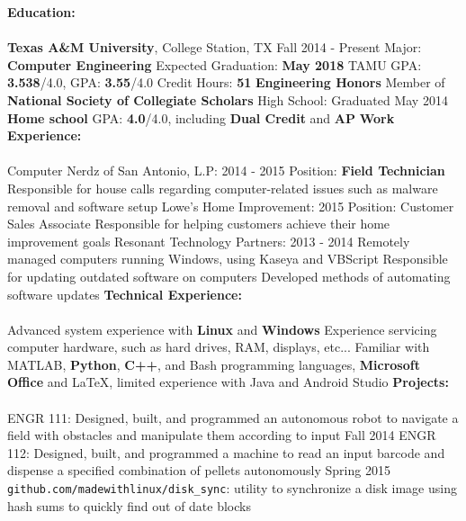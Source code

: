 \documentclass[12pt]{article}
\newcommand{\upspace}{\vspace{0px}}
\newcommand{\zzz}[1]{\upspace \0 \textbf{#1} \\ \vspace{-0.7\baselineskip} \hrulefill \vspace{-2px} \\ }
\newcommand{\aaa}{\upspace \1}
\newcommand{\bbb}{\upspace \2}
\begin{document}
\begin{flushleft}
\begin{outline}[compactitem]
\zzz{Education:}
	\aaa \textbf{Texas A\&M University}, College Station, TX \hfill Fall 2014 - Present
		\bbb Major: \textbf{Computer Engineering}
		\bbb Expected Graduation: \textbf{May 2018}
		\bbb TAMU GPA: \textbf{3.538}/4.0, GPA: \textbf{3.55}/4.0
		\bbb Credit Hours: \textbf{51}
		\bbb \textbf{Engineering Honors}
		\bbb Member of \textbf{National Society of Collegiate Scholars}
	\aaa High School: \hfill Graduated May 2014
		\bbb \textbf{Home school}
		\bbb GPA: \textbf{4.0}/4.0, including \textbf{Dual Credit} and \textbf{AP}
\zzz{Work Experience:}
	\aaa Computer Nerdz of San Antonio, L.P: \hfill 2014 - 2015
		\bbb Position: \textbf{Field Technician}
		\bbb Responsible for house calls regarding computer-related issues such as malware removal and software setup
	\aaa Lowe's Home Improvement: \hfill 2015
		\bbb Position: Customer Sales Associate
		\bbb Responsible for helping customers achieve their home improvement goals
	\aaa Resonant Technology Partners: \hfill 2013 - 2014
		\bbb Remotely managed computers running Windows, using Kaseya and VBScript
		\bbb Responsible for updating outdated software on computers
		\bbb Developed methods of automating software updates
\zzz{Technical Experience:}
	\aaa Advanced system experience with \textbf{Linux} and \textbf{Windows}
	\aaa Experience servicing computer hardware, such as hard drives, RAM, displays, etc...
	\aaa Familiar with MATLAB, \textbf{Python}, \textbf{C++}, and Bash programming languages, \textbf{Microsoft Office} and LaTeX, limited experience with Java and Android Studio
\zzz{Projects:}
	\aaa ENGR 111: Designed, built, and programmed an autonomous robot to navigate a field with obstacles and manipulate them according to input \hfill Fall 2014
	\aaa ENGR 112: Designed, built, and programmed a machine to read an input barcode and dispense a specified combination of pellets autonomously \hfill Spring 2015
	\aaa \verb|github.com/madewithlinux/disk_sync|: utility to synchronize a disk image using hash sums to quickly find out of date blocks 

\end{outline}
\end{flushleft}
\end{document}
